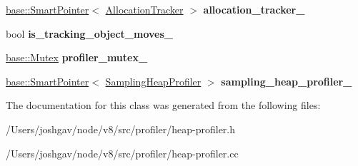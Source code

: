 \begin{DoxyCompactItemize}
\item 
\hyperlink{classv8_1_1base_1_1_smart_pointer}{base\+::\+Smart\+Pointer}$<$ \hyperlink{classv8_1_1internal_1_1_allocation_tracker}{Allocation\+Tracker} $>$ {\bfseries allocation\+\_\+tracker\+\_\+}\hypertarget{classv8_1_1internal_1_1_heap_profiler_ac114e9b18ec381794d194e3008690338}{}\label{classv8_1_1internal_1_1_heap_profiler_ac114e9b18ec381794d194e3008690338}

\item 
bool {\bfseries is\+\_\+tracking\+\_\+object\+\_\+moves\+\_\+}\hypertarget{classv8_1_1internal_1_1_heap_profiler_ad852f5f2e2f6f181e07ea0d06ddc32fc}{}\label{classv8_1_1internal_1_1_heap_profiler_ad852f5f2e2f6f181e07ea0d06ddc32fc}

\item 
\hyperlink{classv8_1_1base_1_1_mutex}{base\+::\+Mutex} {\bfseries profiler\+\_\+mutex\+\_\+}\hypertarget{classv8_1_1internal_1_1_heap_profiler_a0d197c12657bdf94d4da0ce0e833c40e}{}\label{classv8_1_1internal_1_1_heap_profiler_a0d197c12657bdf94d4da0ce0e833c40e}

\item 
\hyperlink{classv8_1_1base_1_1_smart_pointer}{base\+::\+Smart\+Pointer}$<$ \hyperlink{classv8_1_1internal_1_1_sampling_heap_profiler}{Sampling\+Heap\+Profiler} $>$ {\bfseries sampling\+\_\+heap\+\_\+profiler\+\_\+}\hypertarget{classv8_1_1internal_1_1_heap_profiler_a9a370bca927f638cc3166ce47a4edcf3}{}\label{classv8_1_1internal_1_1_heap_profiler_a9a370bca927f638cc3166ce47a4edcf3}

\end{DoxyCompactItemize}


The documentation for this class was generated from the following files\+:\begin{DoxyCompactItemize}
\item 
/\+Users/joshgav/node/v8/src/profiler/heap-\/profiler.\+h\item 
/\+Users/joshgav/node/v8/src/profiler/heap-\/profiler.\+cc\end{DoxyCompactItemize}
